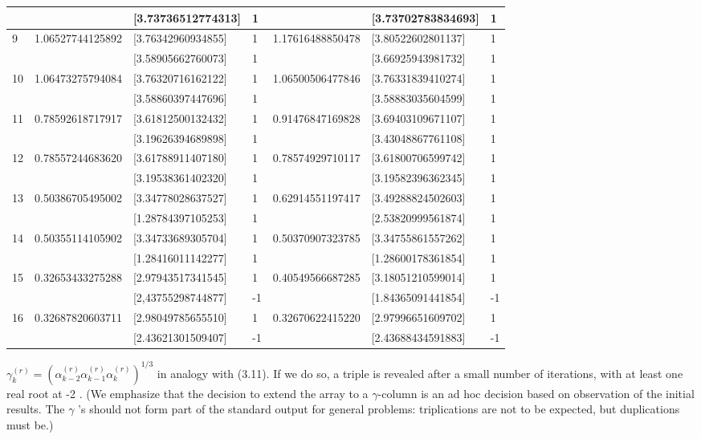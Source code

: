 \documentclass[10pt]{article}
\begin{document}
\begin{table}[h]
\begin{center}
\begin{tabular}{|l|l|l|l|l|l|l|}
\hline
 &  & [3.73736512774313] & 1 &  & [3.73702783834693] & 1 \\
\hline
\multirow[t]{2}{*}{9} & \multirow[t]{2}{*}{1.06527744125892} & [3.76342960934855] & 1 & 1.17616488850478 & [3.80522602801137] & 1 \\
\hline
 &  & [3.58905662760073] & 1 &  & [3.66925943981732] & 1 \\
\hline
10 & 1.06473275794084 & [3.76320716162122] & 1 & 1.06500506477846 & [3.76331839410274] & 1 \\
\hline
 &  & [3.58860397447696] & 1 &  & [3.58883035604599] & 1 \\
\hline
\multirow[t]{2}{*}{11} & \multirow[t]{2}{*}{0.78592618717917} & [3.61812500132432] & 1 & 0.91476847169828 & [3.69403109671107] & 1 \\
\hline
 &  & [3.19626394689898] & 1 &  & [3.43048867761108] & 1 \\
\hline
\multirow[t]{2}{*}{12} & \multirow[t]{2}{*}{0.78557244683620} & [3.61788911407180] & 1 & 0.78574929710117 & [3.61800706599742] & 1 \\
\hline
 &  & [3.19538361402320] & 1 &  & [3.19582396362345] & 1 \\
\hline
13 & 0.50386705495002 & [3.34778028637527] & 1 & 0.62914551197417 & [3.49288824502603] & 1 \\
\hline
 &  & [1.28784397105253] & 1 &  & [2.53820999561874] & 1 \\
\hline
14 & 0.50355114105902 & [3.34733689305704] & 1 & 0.50370907323785 & [3.34755861557262] & 1 \\
\hline
 &  & [1.28416011142277] & 1 &  & [1.28600178361854] & 1 \\
\hline
\multirow[t]{2}{*}{15} & \multirow[t]{2}{*}{0.32653433275288} & [2.97943517341545] & 1 & 0.40549566687285 & [3.18051210599014] & 1 \\
\hline
 &  & [2,43755298744877] & -1 &  & [1.84365091441854] & -1 \\
\hline
\multirow[t]{2}{*}{16} & \multirow[t]{2}{*}{0.32687820603711} & [2.98049785655510] & 1 & 0.32670622415220 & [2.97996651609702] & 1 \\
\hline
 &  & [2.43621301509407] & -1 &  & [2.43688434591883] & -1 \\
\hline
\end{tabular}
\end{center}
\end{table}

$\gamma_{k}^{(r)}=\left(\alpha_{k-2}^{(r)} \alpha_{k-1}^{(r)} \alpha_{k}^{(r)}\right)^{1 / 3}$ in analogy with (3.11). If we do so, a triple is revealed after a small number of iterations, with at least one real root at -2 . (We emphasize that the decision to extend the array to a $\gamma$-column is an ad hoc decision based on observation of the initial results. The $\gamma$ 's should not form part of the standard output for general problems: triplications are not to be expected, but duplications must be.)
\end{document}
